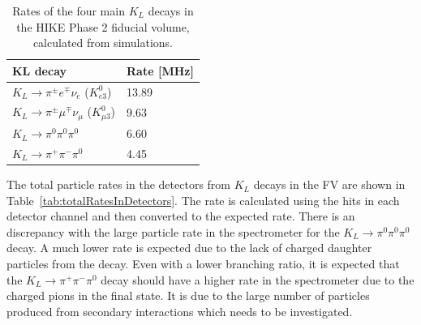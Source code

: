 \documentclass[../../main.tex]{subfiles}
\begin{document}
    \begin{table}[htbp]
        \centering
        \begin{tabular}{|l|l|}
        \hline
        \textbf{KL decay} & \textbf{Rate [MHz]} \\ \hline
        $ K_L \to \pi^{\pm} e^{\mp} \nu_e$ ($K_{e3}^{0}$) & 13.89 \\ \hline
        $ K_L \to \pi^{\pm} \mu^{\mp} \nu_{\mu}$ ($K_{\mu 3}^{0}$) & 9.63 \\ \hline
        $ K_L \to \pi^{0} \pi^{0} \pi^{0}$ & 6.60 \\ \hline
        $ K_L \to \pi^{+} \pi^{-} \pi^{0}$ & 4.45 \\ \hline
        \end{tabular}
        \caption{Rates of the four main $K_L$ decays in the HIKE Phase 2 fiducial volume, calculated from simulations.}%
        \label{tab:hikeDecayRates}%
    \end{table}
    The total particle rates in the detectors from $K_L$ decays in the \gls{FV} are shown in Table~\ref{tab:totalRatesInDetectors}. 
    The rate is calculated using the hits in each detector channel and then converted to the expected rate. 
    There is an discrepancy with the large particle rate in the spectrometer for the $ K_L \to \pi^{0} \pi^{0} \pi^{0}$ decay. A much lower rate is expected due to the lack of charged daughter particles from the decay. Even with a lower branching ratio, it is expected that the $ K_L \to \pi^{+} \pi^{-} \pi^{0}$ decay should have a higher rate in the spectrometer due to the charged pions in the final state. It is due to the large number of particles produced from secondary interactions which needs to be investigated.
\end{document}
